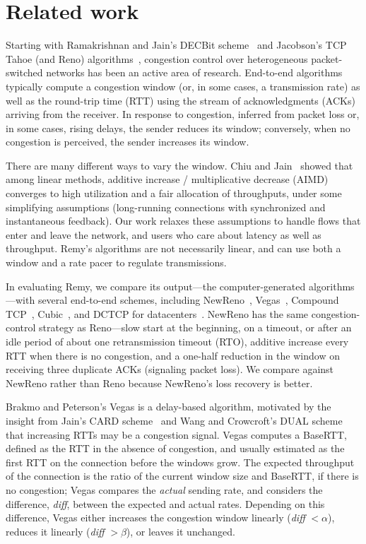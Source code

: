 \section{Related work}
\label{remy:related}

Starting with Ramakrishnan and Jain's DECBit scheme~\cite{decbit} and
Jacobson's TCP Tahoe (and Reno) algorithms~\cite{Jacobson88},
congestion control over heterogeneous packet-switched networks has
been an active area of research. End-to-end algorithms typically
compute a congestion window (or, in some cases, a transmission rate)
as well as the round-trip time (RTT) using the stream of
acknowledgments (ACKs) arriving from the receiver. In response to
congestion, inferred from packet loss or, in some cases, rising
delays, the sender reduces its window; conversely, when no congestion
is perceived, the sender increases its window.

There are many different ways to vary the window. Chiu and
Jain~\cite{chiujain} showed that among linear methods, additive
increase / multiplicative decrease (AIMD) converges to high
utilization and a fair allocation of throughputs, under some
simplifying assumptions (long-running connections with synchronized
and instantaneous feedback). Our work relaxes these assumptions to
handle flows that enter and leave the network, and users who care
about latency as well as throughput. Remy's algorithms are not
necessarily linear, and can use both a window and a rate pacer to
regulate transmissions.

In evaluating Remy, we compare its output---the computer-generated
algorithms---with several end-to-end schemes, including
NewReno~\cite{newreno}, Vegas~\cite{vegas}, Compound
TCP~\cite{compound}, Cubic~\cite{cubic}, and DCTCP for
datacenters~\cite{dctcp}. NewReno has the same congestion-control
strategy as Reno---slow start at the beginning, on a timeout, or after
an idle period of about one retransmission timeout (RTO), additive
increase every RTT when there is no congestion, and a one-half
reduction in the window on receiving three duplicate ACKs (signaling
packet loss). We compare against NewReno rather than Reno because
NewReno's loss recovery is better.

Brakmo and Peterson's Vegas is a delay-based algorithm, motivated by
the insight from Jain's CARD scheme~\cite{card} and Wang and Crowcroft's
DUAL scheme~\cite{dual} that increasing RTTs may be a congestion
signal.  Vegas computes a BaseRTT, defined as the RTT in the absence
of congestion, and usually estimated as the first RTT on the
connection before the windows grow. The expected throughput of the
connection is the ratio of the current window size and BaseRTT, if
there is no congestion; Vegas compares the {\em actual} sending rate,
and considers the difference, {\em diff}, between the expected and
actual rates.  Depending on this difference, Vegas either increases
the congestion window linearly ({\em diff} $< \alpha$), reduces it
linearly ({\em diff} $> \beta$), or leaves it unchanged.

